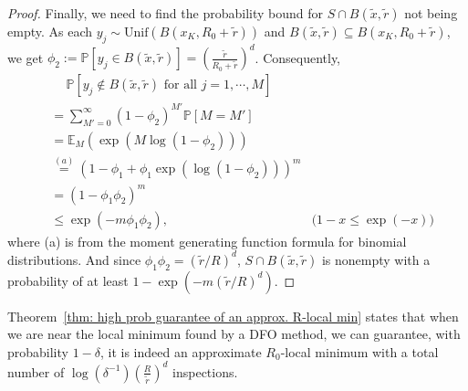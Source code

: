 \begin{proof}
    Finally, we need to find the probability bound for $S \cap B(\tilde{x}, \tilde{r})$ not being empty. As each $y_j \sim \mathrm{Unif}(B(x_K, R_0 + \tilde{r}))$ and $B(\tilde{x},\tilde{r}) \subseteq B(x_K, R_0 + \tilde{r})$, we get $\phi_2 := \mathbb{P}[y_j \in B(\tilde{x}, \tilde{r})] = \left(\frac{\tilde{r}}{R_0 + \tilde{r}}\right)^d$. Consequently,
    \begin{align*}
        & \quad~\mathbb{P}[y_j \not\in B(\tilde{x}, \tilde{r}) \text{ for all } j = 1, \cdots, M] \\
        & =\sum_{M' = 0}^{\infty} \left(1 - \phi_2\right)^{M'} \mathbb{P}[M = M'] \\
        & =\mathbb{E}_{M}(\exp{(M\log(1-\phi_2))}) \\
        & \stackrel{(a)}{=} (1-\phi_1 + \phi_1 \exp{(\log(1-\phi_2))})^m \\
        & = (1-\phi_1 \phi_2 )^m \\
        & \leq \exp(-m\phi_1 \phi_2), & \text{($1-x \leq \exp(-x)$)}
    \end{align*}
    where (a) is from the moment generating function formula for binomial distributions.
    And since $\phi_1 \phi_2 = (\tilde{r}/R)^d$, $S \cap B(\tilde{x}, \tilde{r})$ is nonempty with a probability of at least $1 - \exp(-m (\tilde{r}/R)^d)$.
\end{proof}



Theorem~\ref{thm: high prob guarantee of an approx. R-local min} states that when we are near the local minimum found by a DFO method, we can guarantee, with probability $1-\delta$, it is indeed an approximate $R_0$-local minimum with a total number of $\log(\delta^{-1}) \left(\frac{R}{\tilde{r}}\right)^d$ inspections.
